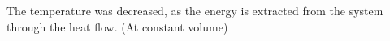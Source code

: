 The temperature was decreased, as the energy is extracted from the system through the heat flow. (At constant volume)